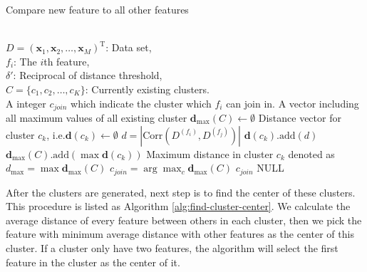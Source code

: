 \documentclass{ieeeaccess}
\theoremstyle{definition}
\begin{document}
    \begin{algorithm}
    \caption{Compare new feature to all other features}
    \label{alg:compare-and-join}
    \begin{algorithmic}[1]
    \REQUIRE ~~\\
        $D=(\bm{x}_1,\bm{x}_2,\ldots,\bm{x}_M)^\text{T}$: Data set, \\
        $f_i$: The $i$th feature, \\
        $\delta'$: Reciprocal of distance threshold,\\
        $C=\{c_1, c_2, \ldots, c_K\}$: Currently existing clusters.
    \ENSURE ~~\\
        A integer $c_{join}$ which indicate the cluster which $f_i$ can join in.
    \STATE A vector including all maximum values of all existing cluster $\bm{d}_{\max}(C) \gets \emptyset$
        \STATE Distance vector for cluster $c_k$, i.e.$\bm{d}(c_k) \gets \emptyset$
            \STATE $d=|\text{Corr}(D^{(f_i)}, D^{(f_j)})|$
            \STATE $\bm{d}(c_k)\text{.add}(d)$
        \ENDFOR
        \STATE $\bm{d}_{\max}(C)\text{.add}(\max{\bm{d}(c_k)})$
    \ENDFOR
    \STATE Maximum distance in cluster $c_k$ denoted as $d_{\max}=\max{\bm{d}_{\max}(C)}$
        \STATE $c_{join}=\arg\max_c{\bm{d}_{\max}(C)}$
        \RETURN $c_{join}$
    \ELSE
        \RETURN NULL
    \ENDIF
    \end{algorithmic}
\end{algorithm}

After the clusters are generated, next step is to find the center of these clusters. This procedure is listed as Algorithm \ref{alg:find-cluster-center}. We calculate the average distance of every feature between others in each cluster, then we pick the feature with minimum average distance with other features as the center of this cluster. If a cluster only have two features, the algorithm will select the first feature in the cluster as the center of it.
\end{document}
